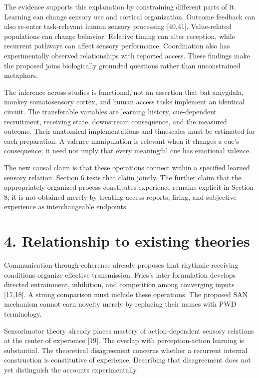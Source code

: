 \documentclass[
  american,
  11pt,
  letterpaper,
]{article}
\begin{document}
The evidence supports this explanation by constraining different parts of it. Learning can change sensory use and cortical organization. Outcome feedback can also re-enter task-relevant human sensory processing {[}40,41{]}. Value-related populations can change behavior. Relative timing can alter reception, while recurrent pathways can affect sensory performance. Coordination also has experimentally observed relationships with reported access. These findings make the proposed joins biologically grounded questions rather than unconstrained metaphors.

The inference across studies is functional, not an assertion that bat amygdala, monkey somatosensory cortex, and human access tasks implement an identical circuit. The transferable variables are learning history, cue-dependent recruitment, receiving state, downstream consequence, and the measured outcome. Their anatomical implementations and timescales must be estimated for each preparation. A valence manipulation is relevant when it changes a cue's consequence; it need not imply that every meaningful cue has emotional valence.

The new causal claim is that these operations connect within a specified learned sensory relation. Section 6 tests that claim jointly. The further claim that the appropriately organized process constitutes experience remains explicit in Section 8; it is not obtained merely by treating access reports, firing, and subjective experience as interchangeable endpoints.

\section{4. Relationship to existing theories}\label{relationship-to-existing-theories}

Communication-through-coherence already proposes that rhythmic receiving conditions organize effective transmission. Fries's later formulation develops directed entrainment, inhibition, and competition among converging inputs {[}17,18{]}. A strong comparison must include these operations. The proposed SAN mechanism cannot earn novelty merely by replacing their names with PWD terminology.

Sensorimotor theory already places mastery of action-dependent sensory relations at the center of experience {[}19{]}. The overlap with perception-action learning is substantial. The theoretical disagreement concerns whether a recurrent internal construction is constitutive of experience. Describing that disagreement does not yet distinguish the accounts experimentally.
\end{document}
